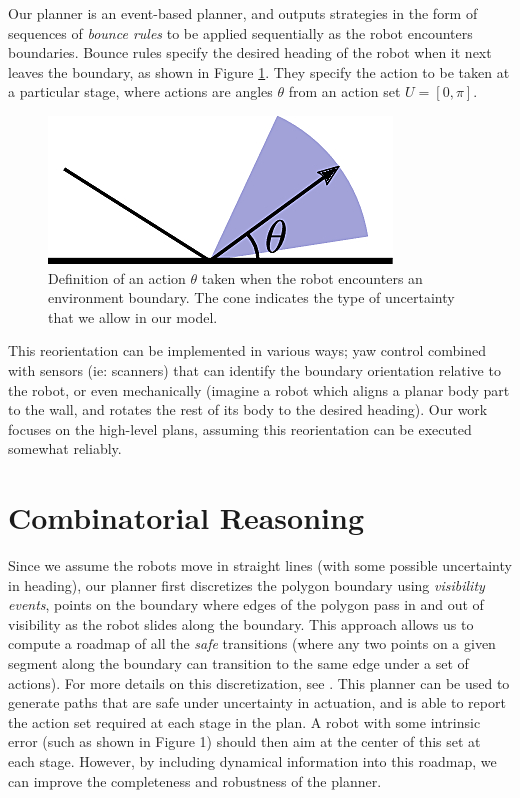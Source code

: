 \documentclass[conference]{IEEEtran}
\begin{document}
Our planner is an event-based planner, and outputs strategies in the form of
sequences of {\em bounce rules} to be applied sequentially as the robot
encounters boundaries.
Bounce rules specify the desired heading of the robot when it next leaves the
boundary, as shown in Figure \ref{fig:bounce_def}. They specify the action to be
taken at a particular stage, where actions are angles $\theta$ from an action
set $U = [0, \pi]$.


\begin{figure}
    \includegraphics[width=0.6\linewidth]{img/bounce_example_nondet.jpg}
    \centering
    \caption[test]{\label{fig:bounce_def} Definition of an action $\theta$
taken when the robot encounters an environment boundary. The cone indicates the
type of uncertainty that we allow in our model.}
\end{figure}

This reorientation can be
implemented in various ways; yaw control combined with sensors (ie: scanners)
that can identify the boundary orientation relative to the robot, or even
mechanically (imagine a robot which aligns a planar body part to the wall, and
rotates the rest of its body to the desired heading). Our work focuses on the
high-level plans, assuming this reorientation can be executed somewhat reliably.

\section{Combinatorial Reasoning}

Since we assume the robots move in straight lines (with some possible
uncertainty in heading), our planner first discretizes the polygon boundary using {\em
visibility events}, points on the boundary where edges of the polygon pass in
and out of visibility as the robot slides along the boundary.
This approach allows us to compute a roadmap of
all the {\em safe} transitions (where any two points on a given segment along the
boundary can transition to the same edge under a set of actions). For
more details on this discretization, see \cite{nilles2018visibility}. This
planner can be used to generate paths that are safe under 
uncertainty in actuation, and is able to report the action set required at each
stage in the plan. A robot with some intrinsic error (such as shown in Figure
1) should then aim at the center of this set at each stage. However, by including dynamical 
information into this roadmap, we can improve the
completeness and robustness of the planner.
\end{document}
